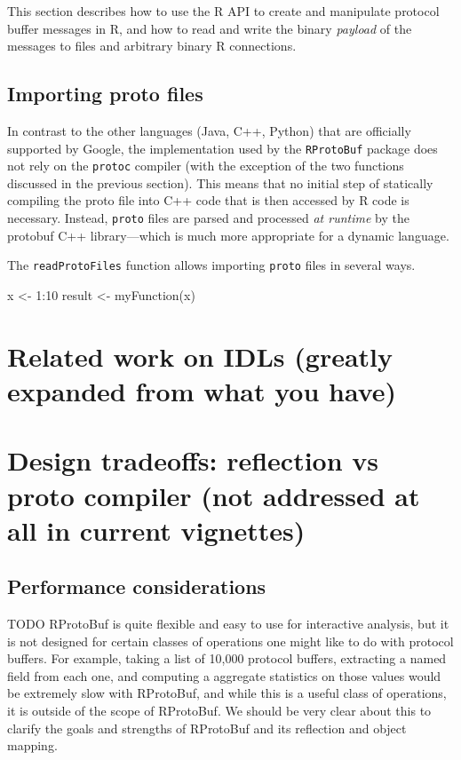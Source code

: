 This section describes how to use the R API to create and manipulate
protocol buffer messages in R, and how to read and write the
binary \emph{payload} of the messages to files and arbitrary binary
R connections.

\subsection{Importing proto files}

In contrast to the other languages (Java, C++, Python) that are officially
supported by Google, the implementation used by the \texttt{RProtoBuf}
package does not rely on the \texttt{protoc} compiler (with the exception of
the two functions discussed in the previous section). This means that no
initial step of statically compiling the proto file into C++ code that is
then accessed by R code is necessary. Instead, \texttt{proto} files are
parsed and processed \textsl{at runtime} by the protobuf C++ library---which
is much more appropriate for a dynamic language.

The \texttt{readProtoFiles} function allows importing \texttt{proto}
files in several ways.

\begin{example}
  x <- 1:10
  result <- myFunction(x)
\end{example}

\section{Related work on IDLs (greatly expanded from what you have)}

\section{Design tradeoffs: reflection vs proto compiler (not addressed
  at all in current vignettes)}

\subsection{Performance considerations}

TODO RProtoBuf is quite flexible and easy to use for interactive
analysis, but it is not designed for certain classes of operations one
might like to do with protocol buffers.  For example, taking a list of
10,000 protocol buffers, extracting a named field from each one, and
computing a aggregate statistics on those values would be extremely
slow with RProtoBuf, and while this is a useful class of operations,
it is outside of the scope of RProtoBuf.  We should be very clear
about this to clarify the goals and strengths of RProtoBuf and its
reflection and object mapping.

